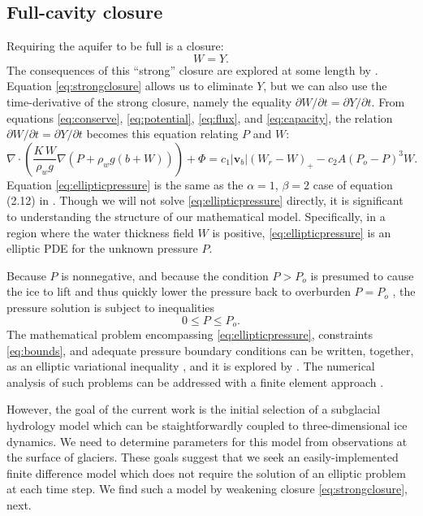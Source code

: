 \documentclass[11pt,final]{amsart}%
\newcommand\bv{\mathbf{v}}
\newcommand{\Div}{\nabla\cdot}
\newcommand{\grad}{\nabla}
\begin{document}
\subsection*{Full-cavity closure}  Requiring the aquifer to be full is a closure:
\begin{equation}
W = Y.\label{eq:strongclosure}
\end{equation}
The consequences of this ``strong'' closure are explored at some length by \cite{Schoofetal2012}.  Equation \eqref{eq:strongclosure} allows us to eliminate $Y$, but we can also use the time-derivative of the strong closure, namely the equality $\partial W/\partial t = \partial Y/\partial t$.  From equations \eqref{eq:conserve}, \eqref{eq:potential}, \eqref{eq:flux}, and \eqref{eq:capacity}, the relation $\partial W/\partial t = \partial Y/\partial t$ becomes this equation relating $P$ and $W$:
\begin{equation}
\Div \left(\frac{K\,W}{\rho_w g} \grad \left(P + \rho_w g (b+W)\right) \right) + \Phi = c_1 |\bv_b| (W_r - W)_+ - c_2 A (P_o - P)^3 W.\label{eq:ellipticpressure}
\end{equation}
Equation \eqref{eq:ellipticpressure} is the same as the $\alpha=1$, $\beta=2$ case of equation (2.12) in \citep{Schoofetal2012}.  Though we will not solve \eqref{eq:ellipticpressure} directly, it is significant to understanding the structure of our mathematical model.  Specifically, in a region where the water thickness field $W$ is positive, \eqref{eq:ellipticpressure} is an elliptic PDE for the unknown pressure $P$.

Because $P$ is nonnegative, and because the condition $P>P_o$ is presumed to cause the ice to lift and thus quickly lower the pressure back to overburden $P=P_o$ \citep{Schoofetal2012}, the pressure solution is subject to inequalities
\begin{equation}
0 \le P \le P_o. \label{eq:bounds}
\end{equation}
The mathematical problem encompassing \eqref{eq:ellipticpressure}, constraints \eqref{eq:bounds}, and adequate pressure boundary conditions can be written, together, as an elliptic variational inequality \citep{KinderlehrerStampacchia}, and it is explored by \cite{Schoofetal2012}.  The numerical analysis of such problems can be addressed with a finite element approach \citep[e.g.][]{SchoofStream,JouvetBueler2012}.

However, the goal of the current work is the initial selection of a subglacial hydrology model which can be staightforwardly coupled to three-dimensional ice dynamics.  We need to determine parameters for this model from observations at the surface of glaciers.  These goals suggest that we seek an easily-implemented finite difference model which does not require the solution of an elliptic problem at each time step.  We find such a model by weakening closure \eqref{eq:strongclosure}, next.
\end{document}
